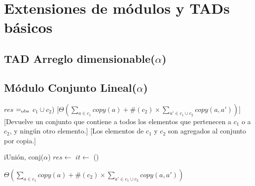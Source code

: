 \section{Extensiones de m\'odulos y TADs b\'asicos}

\subsection{TAD Arreglo dimensionable($\alpha$)}



\subsection{M\'odulo Conjunto Lineal($\alpha$)}


  {$res$ $=_{\mathrm{obs}}$ $c_1 \cup c_2$)} %
  [$\Theta\left(\sum_{a \in c_1} copy(a) + \#(c_2) \times \sum_{a' \in c_1 \cup c_2} copy(a, a')\right)$] %
  [Devuelve un conjunto que contiene a todos los elementos que pertenecen a $c_1$ o a $c_2$, y ning\'un otro elemento.] %
  [Los elementos de $c_1$ y $c_2$ son agregados al conjunto por copia.] %


  \begin{algoritmo}{iUni\'{o}n}{, }{conj($\alpha$)}
    $res \gets$   
     $it \gets$       
    \While(){}{
       
       
    } 
  \end{algoritmo}
  \datosAlgoritmo{} %
  {} %
  {} %
  {$\Theta\left(\sum_{a \in c_1} copy(a) + \#(c_2) \times \sum_{a' \in c_1 \cup c_2} copy(a, a')\right)$} %
  {} %

